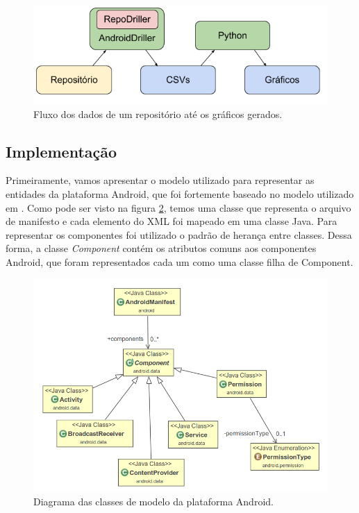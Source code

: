 \documentclass[a4paper,12pt]{article}
\begin{document}
 \begin{figure}[h]
 \centering
 \includegraphics[width=0.65\linewidth]{imgs/workflow.png}
 \caption{Fluxo dos dados de um repositório até os gráficos gerados.}
 \label{fig:workflow}
 \end{figure}



\subsection{Implementação}%
\label{sec:implementacao}


Primeiramente, vamos apresentar o modelo utilizado para representar as entidades da plataforma Android, que foi fortemente baseado no modelo utilizado em \cite{jptt}. Como pode ser visto na figura \ref{fig:model}, temos uma classe que representa o arquivo de manifesto e cada elemento do XML foi mapeado em uma classe Java. Para representar os componentes foi utilizado o padrão de herança entre classes. Dessa forma, a classe \textit{Component} contém os atributos comuns aos componentes Android, que foram representados cada um como uma classe filha de Component.\\

\begin{figure}[H]
\centering
\includegraphics[width=0.8\linewidth]{imgs/model.png}
\caption{Diagrama das classes de modelo da plataforma Android.}
\label{fig:model}
\end{figure}
\end{document}
